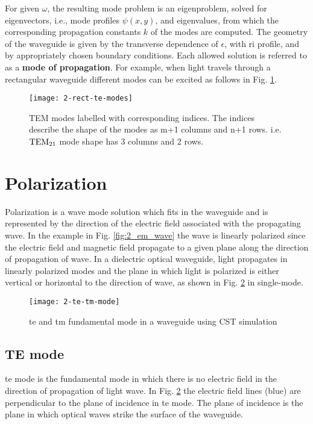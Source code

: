 \documentclass[../report.tex]{subfiles}
\begin{document}
	For given $\omega$, the resulting mode problem is an eigenproblem, solved for eigenvectors, i.e., mode profiles $\psi(x, y)$, and eigenvalues, from which the corresponding propagation constants $k$ of the modes are computed. The geometry of the waveguide is given by the transverse dependence of $\epsilon$, with \gls{ri} profile, and by appropriately chosen boundary conditions. Each allowed solution is referred to as a \textbf{mode of propagation}. For example, when light travels through a rectangular waveguide different modes can be excited as follows in Fig. \ref{fig:2_rect_te_modes}.
	\begin{figure}[H]
		\centering
		\texttt{[image: 2-rect-te-modes]}
		\caption{TEM modes labelled with corresponding indices. The indices describe the shape of the modes as m+1 columns and n+1 rows. i.e. $\mathrm{TEM_{21}}$ mode shape has 3 columns and 2 rows.
			\label{fig:2_rect_te_modes}}
	\end{figure}
	
	\section{Polarization}
	Polarization is a wave mode solution which fits in the waveguide and is represented by the direction of the electric field associated with the propagating wave. In the example in Fig. \ref{fig:2_em_wave} the wave is linearly polarized since the electric field and magnetic field propagate to a given plane along the direction of propagation of wave. In a dielectric optical waveguide, light propagates in linearly polarized modes and the plane in which light is polarized is either vertical or horizontal to the direction of wave, as shown in Fig. \ref{fig:2_te_tm_mode} in single-mode.
	
	\begin{figure}[H]
		\centering
		\texttt{[image: 2-te-tm-mode]}
		\caption{\gls{te} and \gls{tm} fundamental mode in a waveguide using CST simulation}
		\label{fig:2_te_tm_mode}
	\end{figure}	
	\subsection{TE mode}
	\gls{te} mode is the fundamental mode in which there is no electric field in the direction of propagation of light wave. In Fig. \ref{fig:2_te_tm_mode} the electric field lines (blue) are perpendicular to the plane of incidence in \gls{te} mode. The plane of incidence is the plane in which optical waves strike the surface of the waveguide.						
\end{document}
